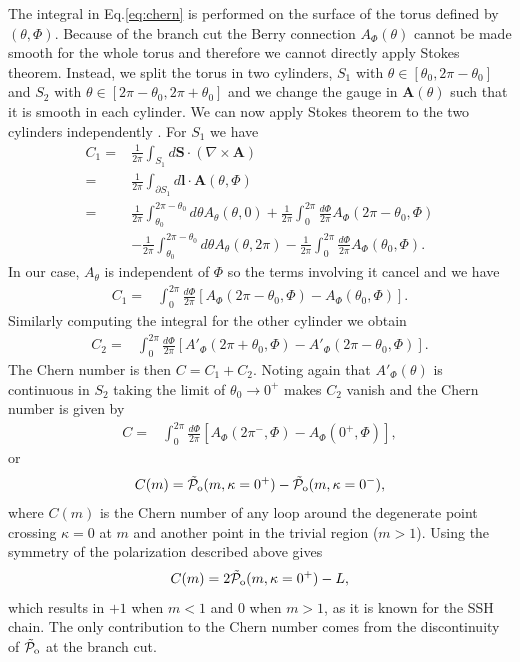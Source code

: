 \documentclass[twocolumn,amsmath,longbibliography,amssymb,superscriptaddress]{revtex4-1}
\newcommand{\tpo}{\tilde{\mathcal{P}}_{\rm o}}
\begin{document}
The integral in Eq.\eqref{eq:chern} is performed on the surface of the torus defined by $(\theta,\Phi)$. Because of the branch cut the Berry connection $A_\Phi(\theta)$ cannot be made smooth for the whole torus and therefore we cannot directly apply Stokes theorem. Instead, we split the torus in two cylinders, $S_1$ with $\theta\in[\theta_0,2\pi-\theta_0]$ and  $S_2$ with $\theta\in[2\pi-\theta_0,2\pi+\theta_0]$ and we change the gauge in $\boldsymbol{A}(\theta)$ such that it is smooth in each cylinder. We can now apply Stokes theorem to the two cylinders independently \cite{Kohmoto1985}. For $S_1$ we have
\begin{align}
C_1 =& \frac{1}{2\pi} \int_{S_1} d\boldsymbol{S}\cdot (\nabla \times \boldsymbol{A}) \nonumber\\
=&\frac{1}{2\pi} \int_{\partial S_1} d\boldsymbol{l}\cdot \boldsymbol{A}(\theta,\Phi) \nonumber\\
=& \frac{1}{2\pi} \int_{\theta_0}^{2\pi-{\theta_0}} d\theta A_\theta(\theta,0) +\frac{1}{2\pi}\int_0^{2\pi} \frac{d\Phi}{2\pi} A_\Phi (2\pi-{\theta_0},\Phi) \nonumber\\
&-\frac{1}{2\pi}\int_{\theta_0}^{2\pi-{\theta_0}} d\theta A_\theta(\theta,2\pi) -\frac{1}{2\pi}\int_0^{2\pi} \frac{d\Phi}{2\pi} A_\Phi ({\theta_0},\Phi).
\end{align}
In our case, $A_\theta$ is independent of $\Phi$ so the terms involving it cancel and we have
\begin{align}
C_1 =& \int_0^{2\pi} \frac{d\Phi}{2\pi} [A_\Phi (2\pi-{\theta_0},\Phi) -A_\Phi ({\theta_0},\Phi)].
\end{align}
Similarly computing the integral for the other cylinder we obtain
\begin{align}
C_2 =& \int_0^{2\pi} \frac{d\Phi}{2\pi} [A'_\Phi (2\pi+{\theta_0},\Phi) -A'_\Phi (2\pi-{\theta_0},\Phi)].
\end{align}
The Chern number is then $C=C_1+C_2$. Noting again that $A'_\Phi(\theta)$ is continuous in $S_2$ taking the limit of $\theta_0\rightarrow 0^+$ makes $C_2$ vanish and the Chern number is given by
\begin{align}
C =& \int_0^{2\pi} \frac{d\Phi}{2\pi} [A_\Phi (2\pi^-,\Phi) -A_\Phi (0^+,\Phi)],
\end{align}
or
\begin{align}
C(m)= \tpo(m,\kappa=0^+)-\tpo(m,\kappa=0^-),
\end{align}
where $C(m)$ is the Chern number of any loop around the degenerate point crossing $\kappa=0$ at $m$ and another point in the trivial region ($m>1$).
Using the symmetry of the polarization described above gives
\begin{align}
C(m)= 2\tpo(m,\kappa=0^+)-L,
\label{eq:Chern_number}
\end{align}
which results in $+1$ when $m<1$ and $0$ when $m>1$, as it is known for the SSH chain. The only contribution to the Chern number comes from the discontinuity of $\tpo$ at the branch cut. 
\end{document}
